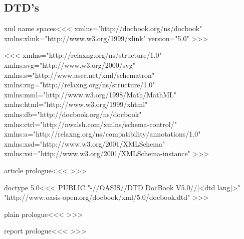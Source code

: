 \subsection{DTD's}

\<xml name spaces\><<<
xmlns="http://docbook.org/ns/docbook"                        \Hnewline  
xmlns:xlink="http://www.w3.org/1999/xlink"                   \Hnewline  
version="5.0"                                                \Hnewline  
>>>

\<\><<<
xmlns="http://relaxng.org/ns/structure/1.0"                  \Hnewline  
xmlns:svg="http://www.w3.org/2000/svg"                       \Hnewline  
xmlns:s="http://www.ascc.net/xml/schematron"                 \Hnewline  
xmlns:rng="http://relaxng.org/ns/structure/1.0"              \Hnewline  
xmlns:mml="http://www.w3.org/1998/Math/MathML"               \Hnewline  
xmlns:html="http://www.w3.org/1999/xhtml"                    \Hnewline  
xmlns:db="http://docbook.org/ns/docbook"                     \Hnewline  
xmlns:ctrl="http://nwalsh.com/xmlns/schema-control/"         \Hnewline  
xmlns:a="http://relaxng.org/ns/compatibility/annotations/1.0"\Hnewline  
xmlns:xsd="http://www.w3.org/2001/XMLSchema"                 \Hnewline  
xmlns:xsi="http://www.w3.org/2001/XMLSchema-instance"        \Hnewline  
>>>




\<article prologue\><<<
  {}
   {}
>>>

\<doctype 5.0\><<<
PUBLIC "-//OASIS//DTD DocBook V5.0//|<dtd lang|>"\Hnewline
       "http://www.oasis-open.org/docbook/xml/5.0/docbook.dtd"
>>>





\<plain prologue\><<<
   {}
   {}
>>>




\<report prologue\><<<
   {}
   {}
>>>





